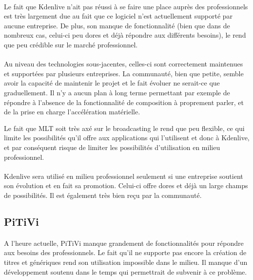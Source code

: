 \paragraph{}

Le fait que Kdenlive n'ait pas réussi à se faire une place auprès des
professionnels est très largement due au fait que ce logiciel n'est
actuellement supporté par aucune entreprise. De plus, son manque de
fonctionnalité (bien que dans de nombreux cas, celui-ci peu dores et
déjà répondre aux différents besoins), le rend que peu crédible
sur le marché professionnel.

\paragraph{}

Au niveau des technologies sous-jacentes, celles-ci sont correctement
maintenues et supportées par plusieurs entreprises. La communauté,
bien que petite, semble avoir la capacité de maintenir le projet et
le fait évoluer ne serait-ce que graduellement. Il n'y a aucun plan
à long terme permettant par exemple de répondre à l'absence de la
fonctionnalité de composition à proprement parler, et de la prise en
charge l'accélération matérielle.

Le fait que MLT soit très axé sur le broadcasting le rend que peu
flexible, ce qui limite les possibilités qu'il offre aux applications
qui l'utilisent et donc à Kdenlive, et par conséquent risque de limiter
les possibilités d'utilisation en milieu professionnel.

\paragraph{}

Kdenlive sera utilisé en milieu professionnel seulement si une entreprise
soutient son évolution et en fait sa promotion. Celui-ci offre dores
et déjà un large champs de possibilités. Il est également très bien
reçu par la communauté.

\subsection {PiTiVi}

\paragraph{}

A l'heure actuelle, PiTiVi manque grandement de fonctionnalités pour
répondre aux besoins des professionnels. Le fait qu'il ne supporte
pas encore la création de titres et génériques rend son utilisation
impossible dans le milieu. Il manque d'un développement soutenu dans
le temps qui permettrait de subvenir à ce problème.

